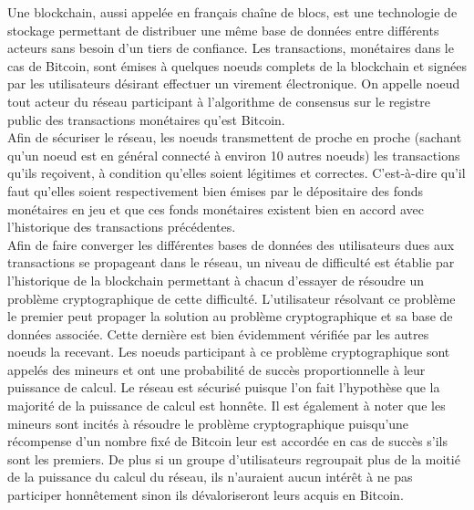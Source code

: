 \documentclass[12pt,a4paper]{article}
\begin{document}
	Une blockchain, aussi appelée en français chaîne de blocs, est une technologie de stockage permettant de distribuer une même base de données entre différents acteurs sans besoin d'un tiers de confiance. Les transactions, monétaires dans le cas de Bitcoin, sont émises à quelques noeuds complets de la blockchain et signées par les utilisateurs désirant effectuer un virement électronique. On appelle noeud tout acteur du réseau participant à l'algorithme de consensus sur le registre public des transactions monétaires qu'est Bitcoin.\\ %
	Afin de sécuriser le réseau, les noeuds transmettent de proche en proche (sachant qu'un noeud est en général connecté à environ 10 autres noeuds) les transactions qu'ils reçoivent, à condition qu'elles soient légitimes et correctes. C'est-à-dire qu'il faut qu'elles soient respectivement bien émises par le dépositaire des fonds monétaires en jeu et que ces fonds monétaires existent bien en accord avec l'historique des transactions précédentes.\\
	Afin de faire converger les différentes bases de données des utilisateurs dues aux transactions se propageant dans le réseau, un niveau de difficulté est établie par l'historique de la blockchain permettant à chacun d'essayer de résoudre un problème cryptographique de cette difficulté. L'utilisateur résolvant ce problème le premier peut propager la solution au problème cryptographique et sa base de données associée. Cette dernière est bien évidemment vérifiée par les autres noeuds la recevant. Les noeuds participant à ce problème cryptographique sont appelés des mineurs et ont une probabilité de succès proportionnelle à leur puissance de calcul. Le réseau est sécurisé puisque l'on fait l'hypothèse que la majorité de la puissance de calcul est honnête. Il est également à noter que les mineurs sont incités à résoudre le problème cryptographique puisqu'une récompense d'un nombre fixé de Bitcoin leur est accordée en cas de succès s'ils sont les premiers. De plus si un groupe d'utilisateurs regroupait plus de la moitié de la puissance du calcul du réseau, ils n'auraient aucun intérêt à ne pas participer honnêtement sinon ils dévaloriseront leurs acquis en Bitcoin.\\%
\end{document}
